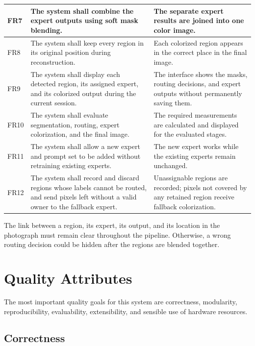 \documentclass{FastFyp}
\begin{document}
\begin{longtable}{|p{1.2cm}|p{7.1cm}|p{6.0cm}|}
FR7 &
The system shall combine the expert outputs using soft mask blending. &
The separate expert results are joined into one color image. \\ \hline

FR8 &
The system shall keep every region in its original position during reconstruction. &
Each colorized region appears in the correct place in the final image. \\ \hline

FR9 &
The system shall display each detected region, its assigned expert, and its colorized output during the current session. &
The interface shows the masks, routing decisions, and expert outputs without permanently saving them. \\ \hline

FR10 &
The system shall evaluate segmentation, routing, expert colorization, and the final image. &
The required measurements are calculated and displayed for the evaluated stages. \\ \hline

FR11 &
The system shall allow a new expert and prompt set to be added without retraining existing experts. &
The new expert works while the existing experts remain unchanged. \\ \hline

FR12 &
The system shall record and discard regions whose labels cannot be routed, and send pixels left without a valid owner to the fallback expert. &
Unassignable regions are recorded; pixels not covered by any retained region receive fallback colorization. \\ \hline

\end{longtable}

The link between a region, its expert, its output, and its location in the photograph must remain clear throughout the pipeline. Otherwise, a wrong routing decision could be hidden after the regions are blended together.

\section{Quality Attributes}

The most important quality goals for this system are correctness, modularity, reproducibility, evaluability, extensibility, and sensible use of hardware resources.

\subsection{Correctness}
\end{document}
